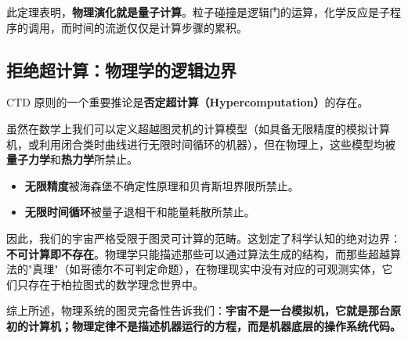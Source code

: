 此定理表明，\textbf{物理演化就是量子计算}。粒子碰撞是逻辑门的运算，化学反应是子程序的调用，而时间的流逝仅仅是计算步骤的累积。

\subsection{拒绝超计算：物理学的逻辑边界}

CTD 原则的一个重要推论是\textbf{否定超计算（Hypercomputation）}的存在。

虽然在数学上我们可以定义超越图灵机的计算模型（如具备无限精度的模拟计算机，或利用闭合类时曲线进行无限时间循环的机器），但在物理上，这些模型均被\textbf{量子力学}和\textbf{热力学}所禁止。

\begin{itemize}
\item \textbf{无限精度}被海森堡不确定性原理和贝肯斯坦界限所禁止。

\item \textbf{无限时间循环}被量子退相干和能量耗散所禁止。
\end{itemize}

因此，我们的宇宙严格受限于图灵可计算的范畴。这划定了科学认知的绝对边界：\textbf{不可计算即不存在}。物理学只能描述那些可以通过算法生成的结构，而那些超越算法的"真理"（如哥德尔不可判定命题），在物理现实中没有对应的可观测实体，它们只存在于柏拉图式的数学理念世界中。

综上所述，物理系统的图灵完备性告诉我们：\textbf{宇宙不是一台模拟机，它就是那台原初的计算机；物理定律不是描述机器运行的方程，而是机器底层的操作系统代码。}
